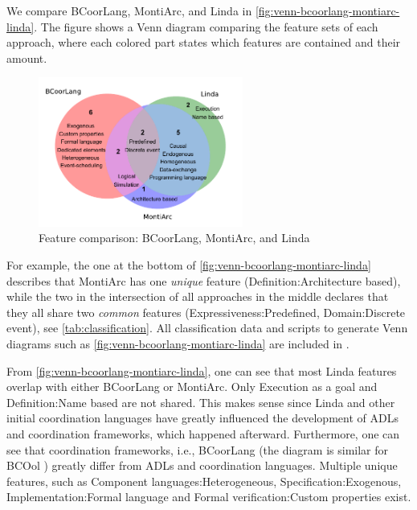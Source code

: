 \documentclass[runningheads]{llncs}
\begin{document}
We compare BCoorLang, MontiArc, and Linda in \autoref{fig:venn-bcoorlang-montiarc-linda}.
The figure shows a Venn diagram comparing the feature sets of each approach, where each colored part states which features are contained and their amount.

\begin{figure}[ht]
	\centering
	\includegraphics[width=0.6\textwidth]{images/venn_bcoorlang_montiarc_linda}
	\caption{Feature comparison: BCoorLang, MontiArc, and Linda}
	\label{fig:venn-bcoorlang-montiarc-linda}
\end{figure}

For example, the one at the bottom of \autoref{fig:venn-bcoorlang-montiarc-linda} describes that MontiArc has one \textit{unique} feature (\textsf{Definition:Architecture based}), while the two in the intersection of all approaches in the middle declares that they all share two \textit{common} features (\textsf{Expressiveness:Predefined, Domain:Discrete event}), see \autoref{tab:classification}.
All classification data and scripts to generate Venn diagrams such as \autoref{fig:venn-bcoorlang-montiarc-linda} are included in \cite{timkrauterArtifactsCoordination2024}.

From \autoref{fig:venn-bcoorlang-montiarc-linda}, one can see that most Linda features overlap with either BCoorLang or MontiArc.
Only \textsf{Execution} as a goal and \textsf{Definition:Name based} are not shared.
This makes sense since Linda and other initial coordination languages have greatly influenced the development of ADLs and coordination frameworks, which happened afterward.
Furthermore, one can see that coordination frameworks, i.e., BCoorLang (the diagram is similar for BCOol \cite{varalarsenBehavioralCoordinationOperator2015,varalarsenBCOolBehavioralCoordination2016}) greatly differ from ADLs and coordination languages.
Multiple unique features, such as \textsf{Component languages:Heterogeneous}, \textsf{Specification:Exogenous}, \textsf{Implementation:Formal language} and \textsf{Formal verification:Custom properties} exist.
\end{document}
